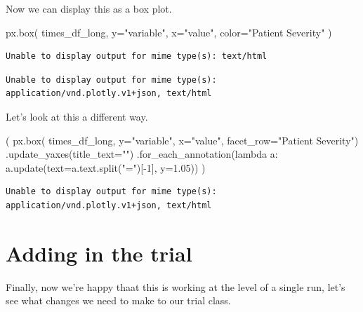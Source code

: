\documentclass[
  letterpaper,
  DIV=11,
  numbers=noendperiod]{scrreprt}
\newenvironment{Shaded}{}{}
\newcommand{\DecValTok}[1]{\textcolor[rgb]{0.00,0.36,0.77}{#1}}
\newcommand{\FloatTok}[1]{\textcolor[rgb]{0.00,0.36,0.77}{#1}}
\newcommand{\KeywordTok}[1]{\textcolor[rgb]{0.84,0.23,0.29}{#1}}
\newcommand{\NormalTok}[1]{\textcolor[rgb]{0.14,0.16,0.18}{#1}}
\newcommand{\OperatorTok}[1]{\textcolor[rgb]{0.14,0.16,0.18}{#1}}
\newcommand{\StringTok}[1]{\textcolor[rgb]{0.01,0.18,0.38}{#1}}
\begin{document}
Now we can display this as a box plot.

\begin{Shaded}
\begin{Highlighting}[]
\NormalTok{px.box(}
\NormalTok{    times\_df\_long,}
\NormalTok{    y}\OperatorTok{=}\StringTok{"variable"}\NormalTok{,}
\NormalTok{    x}\OperatorTok{=}\StringTok{"value"}\NormalTok{,}
\NormalTok{    color}\OperatorTok{=}\StringTok{"Patient Severity"}
\NormalTok{)}
\end{Highlighting}
\end{Shaded}

\begin{verbatim}
Unable to display output for mime type(s): text/html
\end{verbatim}

\begin{verbatim}
Unable to display output for mime type(s): application/vnd.plotly.v1+json, text/html
\end{verbatim}

Let's look at this a different way.

\begin{Shaded}
\begin{Highlighting}[]
\NormalTok{(}
\NormalTok{    px.box(}
\NormalTok{    times\_df\_long,}
\NormalTok{    y}\OperatorTok{=}\StringTok{"variable"}\NormalTok{,}
\NormalTok{    x}\OperatorTok{=}\StringTok{"value"}\NormalTok{,}
\NormalTok{    facet\_row}\OperatorTok{=}\StringTok{"Patient Severity"}\NormalTok{)}
\NormalTok{    .update\_yaxes(title\_text}\OperatorTok{=}\StringTok{""}\NormalTok{)}
\NormalTok{    .for\_each\_annotation(}\KeywordTok{lambda}\NormalTok{ a: a.update(text}\OperatorTok{=}\NormalTok{a.text.split(}\StringTok{"="}\NormalTok{)[}\OperatorTok{{-}}\DecValTok{1}\NormalTok{], y}\OperatorTok{=}\FloatTok{1.05}\NormalTok{))}
\NormalTok{)}
\end{Highlighting}
\end{Shaded}

\begin{verbatim}
Unable to display output for mime type(s): application/vnd.plotly.v1+json, text/html
\end{verbatim}

\section{Adding in the trial}\label{adding-in-the-trial}

Finally, now we're happy thaat this is working at the level of a single
run, let's see what changes we need to make to our trial class.
\end{document}
